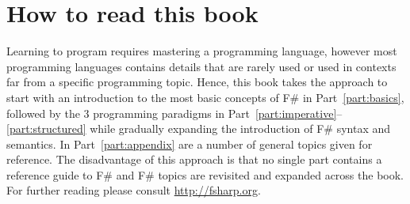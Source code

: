 \section{How to read this book}
Learning to program requires mastering a programming language, however most programming languages contains details that are rarely used or used in contexts far from a specific programming topic. Hence, this book takes the approach to start with an introduction to the most basic concepts of F\# in Part~\ref{part:basics}, followed by the 3 programming paradigms in Part~\ref{part:imperative}--\ref{part:structured} while gradually expanding the introduction of F\# syntax and semantics. In Part~\ref{part:appendix} are a number of general topics given for reference. The disadvantage of this approach is that no single part contains a reference guide to F\# and F\# topics are revisited and expanded across the book. For further reading please consult \url{http://fsharp.org}.

